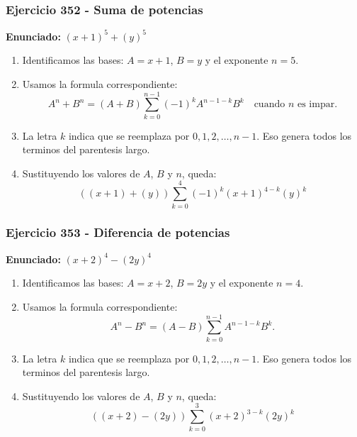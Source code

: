 \documentclass[11pt,a4paper]{article}
\begin{document}
\subsubsection*{Ejercicio 352 - Suma de potencias}
\textbf{Enunciado:} $ \left(x + 1\right)^{5}+\left(y\right)^{5} $\par
\begin{enumerate}[leftmargin=2em]
\item Identificamos las bases: \(A=x + 1\), \(B=y\) y el exponente \(n=5\).
\item Usamos la formula correspondiente: \[A^n+B^n=(A+B)\sum_{k=0}^{n-1}(-1)^kA^{n-1-k}B^k\quad\text{cuando }n\text{ es impar}.\]
\item La letra \(k\) indica que se reemplaza por \(0,1,2,\ldots,n-1\). Eso genera todos los terminos del parentesis largo.
\item Sustituyendo los valores de \(A\), \(B\) y \(n\), queda: \[\boxed{\left(\left(x + 1\right)+\left(y\right)\right)\sum_{k=0}^{4}(-1)^k\left(x + 1\right)^{4-k}\left(y\right)^k}\]
\end{enumerate}

\vspace{0.2cm}
\subsubsection*{Ejercicio 353 - Diferencia de potencias}
\textbf{Enunciado:} $ \left(x + 2\right)^{4}-\left(2 y\right)^{4} $\par
\begin{enumerate}[leftmargin=2em]
\item Identificamos las bases: \(A=x + 2\), \(B=2 y\) y el exponente \(n=4\).
\item Usamos la formula correspondiente: \[A^n-B^n=(A-B)\sum_{k=0}^{n-1}A^{n-1-k}B^k.\]
\item La letra \(k\) indica que se reemplaza por \(0,1,2,\ldots,n-1\). Eso genera todos los terminos del parentesis largo.
\item Sustituyendo los valores de \(A\), \(B\) y \(n\), queda: \[\boxed{\left(\left(x + 2\right)-\left(2 y\right)\right)\sum_{k=0}^{3}\left(x + 2\right)^{3-k}\left(2 y\right)^k}\]
\end{enumerate}

\vspace{0.2cm}
\end{document}
